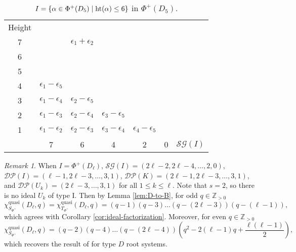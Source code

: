 \documentclass[12pt]{amsart}
\theoremstyle{plain}
\theoremstyle{definition}
\theoremstyle{remark}
\newtheorem{remark}[theorem]{Remark}
\newcommand{\Z}{\mathbb{Z}}
\newcommand{\quasi}{\operatorname{quasi}}
\newcommand{\DP}{{\mathcal{DP}}}
\newcommand{\SG}{{\mathcal{SG}}}
\begin{document}
 \begin{table}[htbp]
\centering
{\footnotesize\renewcommand{} 
\begin{tabular}{ccccccc}
\mbox{Height} & & & & &\\
7&   & $\epsilon_1+\epsilon_2$   &  & && \\
\hhline{~~-}
6&  &  \multicolumn{1}{|c|}{\cellcolor{green!50}{$\epsilon_1+\epsilon_3$}}   & & &&\\
\cline{4-4}
5 &&\multicolumn{1}{|c}{\cellcolor{green!50}{$\epsilon_1+\epsilon_4$}}   &\multicolumn{1}{c|}{\cellcolor{yellow!25}{$\epsilon_2+\epsilon_3$}}  && \\
\cline{2-2}
4& \multicolumn{1}{|c}{\cellcolor{green!50}$\epsilon_1-\epsilon_5$} &  \cellcolor{green!50}{$\epsilon_1+\epsilon_5$}  & \multicolumn{1}{c|}{\cellcolor{yellow!25}{$\epsilon_2+\epsilon_4$}} &&&\\
\cline{5-5}
3 & \multicolumn{1}{|c}{\cellcolor{green!50}$\epsilon_1-\epsilon_4$} & \cellcolor{yellow!25}$\epsilon_2-\epsilon_5$  &  \cellcolor{yellow!25}{$\epsilon_2+\epsilon_5$} &\multicolumn{1}{c|}{\cellcolor{blue!25}{$\epsilon_3 +\epsilon_4$}}  &&\\
2& \multicolumn{1}{|c}{\cellcolor{green!50}$\epsilon_1-\epsilon_3$} & \cellcolor{yellow!25}$\epsilon_2-\epsilon_4$ &  \cellcolor{blue!25}$\epsilon_3-\epsilon_5$  &\multicolumn{1}{c|}{\cellcolor{blue!25}{$\epsilon_3 +\epsilon_5$}}&& \\
\cline{6-6}
1 & \multicolumn{1}{|c}{\cellcolor{green!50}$\epsilon_1-\epsilon_2$} & \cellcolor{yellow!25}$\epsilon_2 -\epsilon_3$& \cellcolor{blue!25}$\epsilon_3-\epsilon_4$  &  \cellcolor{red!25}$\epsilon_4-\epsilon_5$ & \multicolumn{1}{c|}{\cellcolor{red!25}{$\epsilon_4+\epsilon_5$}} &\\
\cline{2-6}
& 7 & 6 & 4 & 2  & 0 & $\SG(I)$
\end{tabular}
}
\bigskip
\caption{$I=\{\alpha \in \Phi^+(D_5) \mid {\rm ht}(\alpha) \le 6\}$ in $\Phi^+(D_5)$.}
\label{tab:D5-ideal-eg}
\end{table}

\begin{remark}
\label{rem:D-recover}
When $I=\Phi^+(D_\ell)$, $\SG(I)=(2\ell-2,2\ell-4,\ldots,2,0)$, $\DP(I)=(\ell-1, 2\ell-3,\ldots,3,1)$, $\DP(K)=(2\ell-1,2\ell-3,\ldots,3,1)$, and 
$\DP(U_k)=(2\ell-3,\ldots,3,1)$ for all $1 \le k \le \ell$. 
Note that $s=2$, so there is no ideal $U_k$ of type I.
Then by Lemma \ref{lem:D-to-B}, for odd $q \in \Z_{>0}$
   \begin{equation*} 
\chi^{\quasi}_{S_{\Phi^+}}(D_\ell, q)=\chi^{\quasi}_{T_{\Phi^+}}(D_\ell, q)=(q-1)(q-3)\ldots(q-(2\ell-3))(q-(\ell-1)),
\end{equation*}
which agrees with Corollary \ref{cor:ideal-factorization}.
Moreover, for even $q \in \Z_{>0}$ 
   \begin{equation*} 
\chi^{\quasi}_{S_{\Phi^+}}(D_\ell, q)=(q-2)(q-4)\ldots(q-(2\ell-4))\left(q^2-2(\ell-1)q+\frac{\ell(\ell-1)}2\right),
\end{equation*}
which recovers the result of \cite[Theorem 4.8]{KTT07} for type $D$ root systems.
 \end{remark}
\end{document}
